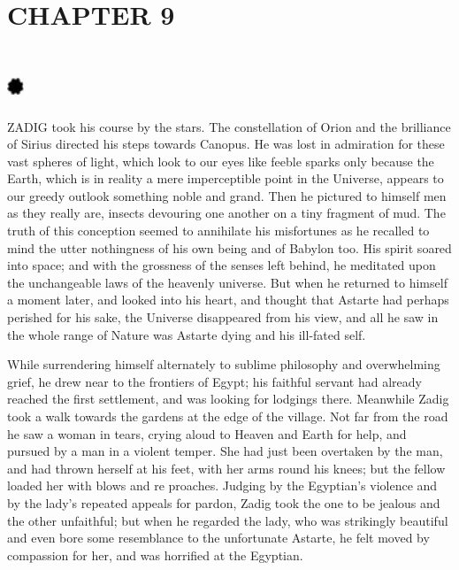 \documentclass{article}
\begin{document}
\begin{center}
\section*{\textbf{CHAPTER 9  }}

\section*{%
\includegraphics[width=14pt, height=15pt, keepaspectratio=true]{Zadig or L'Ingenu - Voltaire-fig012.jpg}
}

 

ZADIG took his course by the stars. The constellation of Orion and the brilliance 
of Sirius directed his steps towards Canopus. He was lost in admiration for these 
vast spheres of light, which look to our eyes like feeble sparks only because the 
Earth, which is in reality a mere imperceptible point in the Universe, appears 
to our greedy outlook something noble and grand. Then he pictured to himself men 
as they really are, insects devouring one another on a tiny fragment of mud. The 
truth of this conception seemed to annihilate his misfortunes as he recalled to 
mind the utter nothingness of his own being and of Babylon too. His spirit soared 
into space; and with the grossness of the senses left behind, he meditated upon 
the unchangeable laws of the heavenly universe. But when he returned to himself 
a moment later, and looked into his heart, and thought that Astarte had perhaps 
perished for his sake, the Universe disappeared from his view, and all he saw in 
the whole range of Nature was Astarte dying and his ill-fated self. 

While surrendering himself alternately to sublime philosophy and overwhelming grief, 
he drew near to the frontiers of Egypt; his faithful servant had already reached 
the first settlement, and was looking for lodgings there. Meanwhile Zadig took 
a walk towards the gardens at the edge of the village. Not far from the road he 
saw a woman in tears, crying aloud to Heaven and Earth for help, and pursued by 
a man in a violent temper. She had just been overtaken by the man, and had thrown 
herself at his feet, with her arms round his knees; but the fellow loaded her with 
blows and re proaches. Judging by the Egyptian's violence and by the lady's repeated 
appeals for pardon, Zadig took the one to be jealous and the other unfaithful; 
but when he regarded the lady, who was strikingly beautiful and even bore some 
resemblance to the unfortunate Astarte, he felt moved by compassion for her, and 
was horrified at the Egyptian. 


\end{center}
\end{document}
